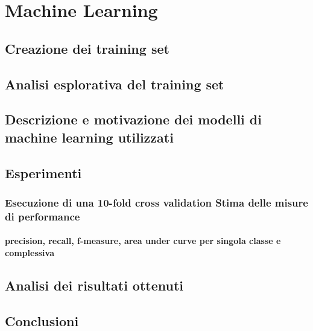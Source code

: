 \setcounter{chapter}{0}
\part{Machine Learning}
\chapter{Creazione dei training set}
\chapter{Analisi esplorativa del training set}
\chapter{Descrizione e motivazione dei modelli di machine learning utilizzati}

\chapter{Esperimenti}

\section{Esecuzione di una 10-fold cross validation
	Stima delle misure di performance}
\subsection{precision, recall, f-measure, area under curve per singola classe e complessiva}

\chapter{Analisi dei risultati ottenuti}
\chapter{Conclusioni}
